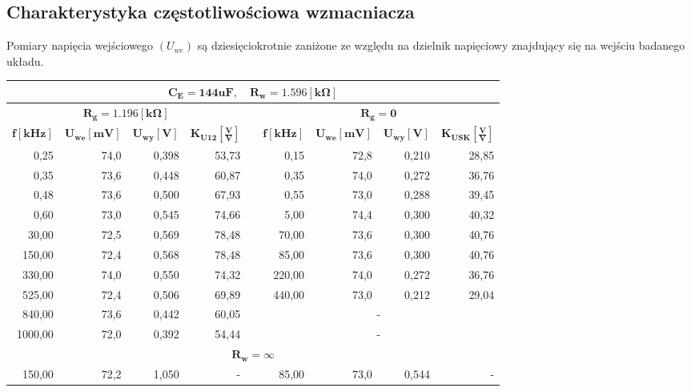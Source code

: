 \documentclass[a4paper,12pt]{article}
\begin{document}
\subsection{Charakterystyka częstotliwościowa wzmacniacza}
Pomiary napięcia wejściowego $(U_{we})$ są dziesięciokrotnie zaniżone ze względu na dzielnik napięciowy
znajdujący się na wejściu badanego układu.
\begin{table}[ht]
  \begin{center}
  \begin{tabular}{|r|r|r|r|r|r|r|r|r|}
    \hline
    \multicolumn{9}{|c|}{\textbf{$\mathbf{C_E = 144uF}, \quad \mathbf{R_w=1.596[k\Omega]}$}} \\ \hline
    \multicolumn{4}{|c|}{$\mathbf{R_g = 1.196[k\Omega]}$} & & \multicolumn{4}{c|}{$\mathbf{R_g = 0}$} \\ \cline{1-4} \cline{6-9}
    $\mathbf{f[kHz]}$ & $\mathbf{U_{we}[mV]}$ & $\mathbf{U_{wy}[V]}$ & $\mathbf{K_{U12}[\frac{V}{V}]}$ & & $\mathbf{f[kHz]}$ & $\mathbf{U_{we}[mV]}$ & $\mathbf{U_{wy}[V]}$ & $\mathbf{K_{USK}[\frac{V}{V}]}$ \\ \cline{1-4} \cline{6-9}
    0,25 & 74,0 & 0,398 & 53,73 & & 0,15 & 72,8 & 0,210 & 28,85 \\ \cline{1-4} \cline{6-9}
    0,35 & 73,6 & 0,448 & 60,87 & & 0,35 & 74,0 & 0,272 & 36,76 \\ \cline{1-4} \cline{6-9}
    0,48 & 73,6 & 0,500 & 67,93 & & 0,55 & 73,0 & 0,288 & 39,45 \\ \cline{1-4} \cline{6-9}
    0,60 & 73,0 & 0,545 & 74,66 & & 5,00 & 74,4 & 0,300 & 40,32 \\ \cline{1-4} \cline{6-9}
    30,00 & 72,5 & 0,569 & 78,48 & & 70,00 & 73,6 & 0,300 & 40,76 \\ \cline{1-4} \cline{6-9}
    150,00 & 72,4 & 0,568 & 78,48 & & 85,00 & 73,6 & 0,300 & 40,76 \\ \cline{1-4} \cline{6-9}
    330,00 & 74,0 & 0,550 & 74,32 & & 220,00 & 74,0 & 0,272 & 36,76 \\ \cline{1-4} \cline{6-9}
    525,00 & 72,4 & 0,506 & 69,89 & & 440,00 & 73,0 & 0,212 & 29,04 \\ \cline{1-4} \cline{6-9}
    840,00 & 73,6 & 0,442 & 60,05 & & \multicolumn{4}{c|}{-} \\ \cline{1-4} \cline{6-9}
    1000,00 & 72,0 & 0,392 & 54,44 & & \multicolumn{4}{c|}{-} \\ \hline
    \multicolumn{9}{|c|}{$\mathbf{R_w = \infty}$} \\ \hline
    150,00 & 72,2 & 1,050 & - & & 85,00 & 73,0 & 0,544 & - \\ \hline

\end{tabular}
\end{center}
\end{table}
\end{document}
